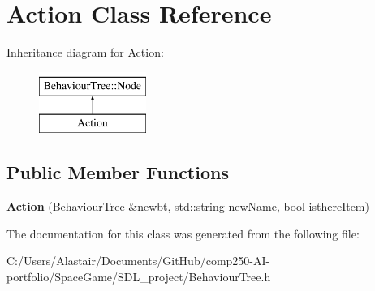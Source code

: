 \hypertarget{class_action}{}\section{Action Class Reference}
\label{class_action}
Inheritance diagram for Action\+:\begin{figure}[H]
\begin{center}
\leavevmode
\includegraphics[height=2.000000cm]{class_action}
\end{center}
\end{figure}
\subsection*{Public Member Functions}
\begin{DoxyCompactItemize}
\item 
\mbox{\label{class_action_adcc22e4c3499615de29737c0cb5544b9}} 
{\bfseries Action} (\hyperlink{class_behaviour_tree}{Behaviour\+Tree} \&newbt, std\+::string new\+Name, bool isthere\+Item)
\end{DoxyCompactItemize}


The documentation for this class was generated from the following file\+:\begin{DoxyCompactItemize}
\item 
C\+:/\+Users/\+Alastair/\+Documents/\+Git\+Hub/comp250-\/\+A\+I-\/portfolio/\+Space\+Game/\+S\+D\+L\+\_\+project/Behaviour\+Tree.\+h\end{DoxyCompactItemize}
